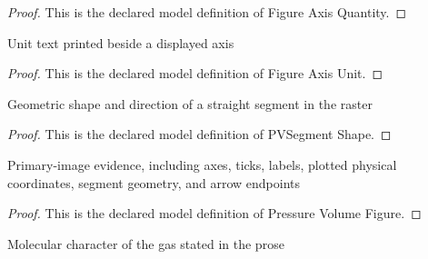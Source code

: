 \begin{proof}
  This is the declared model definition of Figure Axis Quantity.
\end{proof}
\begin{definition}
  \label{def:physics:phyx-mini-0426:phyxminiproblems-problemphyxmini0426-figureaxisunit}
  Unit text printed beside a displayed axis
\end{definition}
\begin{proof}
  This is the declared model definition of Figure Axis Unit.
\end{proof}
\begin{definition}
  \label{def:physics:phyx-mini-0426:phyxminiproblems-problemphyxmini0426-pvsegmentshape}
  Geometric shape and direction of a straight segment in the raster
\end{definition}
\begin{proof}
  This is the declared model definition of PVSegment Shape.
\end{proof}
\begin{definition}
  \label{def:physics:phyx-mini-0426:phyxminiproblems-problemphyxmini0426-pressurevolumefigure}
  Primary-image evidence, including axes, ticks, labels, plotted physical coordinates, segment geometry, and arrow endpoints
\end{definition}
\begin{proof}
  This is the declared model definition of Pressure Volume Figure.
\end{proof}
\begin{definition}
  \label{def:physics:phyx-mini-0426:phyxminiproblems-problemphyxmini0426-workinggasmodel}
  Molecular character of the gas stated in the prose
\end{definition}
